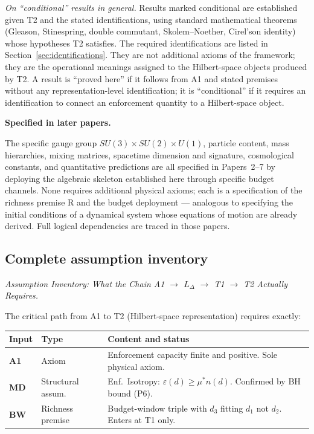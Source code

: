 \documentclass[11pt]{article}
\theoremstyle{remark}
\begin{document}
\smallskip\noindent\textit{On ``conditional'' results in general.}  Results marked conditional are established given T2 and the stated identifications, using standard mathematical theorems (Gleason, Stinespring, double commutant, Skolem--Noether, Cirel'son identity) whose hypotheses T2 satisfies.  The required identifications are listed in Section~\ref{sec:identifications}.  They are not additional axioms of the framework; they are the operational meanings assigned to the Hilbert-space objects produced by T2.  A result is ``proved here'' if it follows from A1 and stated premises without any representation-level identification; it is ``conditional'' if it requires an identification to connect an enforcement quantity to a Hilbert-space object.

\smallskip\noindent\textbf{Specified in later papers.}
\label{sec:deferred}

The specific gauge group $SU(3)\times SU(2)\times U(1)$, particle content, mass hierarchies, mixing matrices, spacetime dimension and signature, cosmological constants, and quantitative predictions are all specified in Papers~2--7 by deploying the algebraic skeleton established here through specific budget channels.  None requires additional physical axioms; each is a specification of the richness premise R and the budget deployment --- analogous to specifying the initial conditions of a dynamical system whose equations of motion are already derived.  Full logical dependencies are traced in those papers.

\subsection{Complete assumption inventory}
\label{sec:assumption_inventory}


\medskip\noindent\textit{Assumption Inventory: What the Chain A1 $\to$ $L_\Delta$ $\to$ T1 $\to$ T2 Actually Requires.}
\label{box:assumption_inventory}

The critical path from A1 to T2 (Hilbert-space representation) requires exactly:

\medskip
\begin{center}
\smallskip
{\small
\begin{tabular*}{\textwidth}{@{\extracolsep{\fill}}lll@{}}
\textbf{Input} & \textbf{Type} & \textbf{Content and status} \\[2pt]
\hline\noalign{\smallskip}
\textbf{A1} & Axiom & Enforcement capacity finite and positive.  Sole physical axiom. \\[4pt]
\textbf{MD} & Structural assum. & Enf.\ Isotropy: $\varepsilon(d) \ge \mu^* n(d)$.  Confirmed by BH bound (P6). \\[4pt]
\textbf{BW} & Richness premise & Budget-window triple with $d_3$ fitting $d_1$ not $d_2$.  Enters at T1 only. \\
\end{tabular*}}
\label{tab:critical_path}
\end{center}
\end{document}
